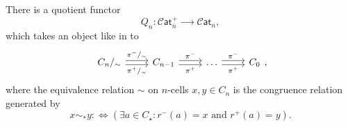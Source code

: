\documentclass[12pt,a4paper]{article}
\numberwithin{equation}{section}
\newcommand{\cat}[1]{\mathscr{C} \mathsf{at}_{\overline{#1}}}
\begin{document}
\begin{definition}\label{def:cat_quotient_by_relations}
    There is a quotient functor
    \begin{equation}
        Q_n: \cat{n}^+ \xrightarrow{\qquad} \cat{n},
    \end{equation}
    which takes an object like in  to
    \begin{equation}
        \begin{tikzcd}
            C_n /_{\sim} \arrow[r, shift left=0.5ex, "\pi^-/_{\sim}"] \arrow[r, shift right=0.5ex, "\pi^+/_{\sim}"'] & C_{n-1} \arrow[r, shift left=0.5ex, "\pi^-"] \arrow[r, shift right=0.5ex, "\pi^+"'] & \dots \arrow[r, shift left=0.5ex, "\pi^-"] \arrow[r, shift right=0.5ex, "\pi^+"'] & C_0
        \end{tikzcd},
    \end{equation}
    where the equivalence relation $\sim$ on $n$-cells $x,y \in C_n$ is the congruence relation generated by
    \begin{equation}
        x \sim_* y :\Leftrightarrow \left( \exists a \in C_\star: r^- (a) = x \text{ and } r^+(a) = y \right).
    \end{equation}
\end{definition}
\end{document}
